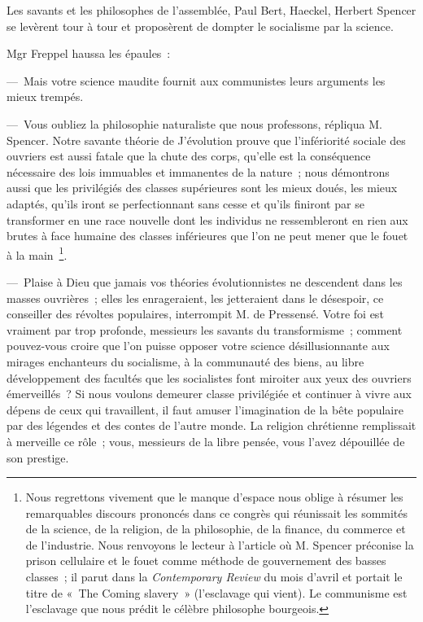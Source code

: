 \documentclass[french,twoside]{book} %
\begin{document}
Les savants et les philosophes de l’assemblée, Paul Bert, Haeckel, Herbert Spencer se levèrent tour à tour et proposèrent de dompter le socialisme par la science.\par
Mgr Freppel haussa les épaules :\par
— Mais votre science maudite fournit aux communistes leurs arguments les mieux trempés.\par
— Vous oubliez la philosophie naturaliste que nous professons, répliqua M. Spencer. Notre savante théorie de J'évolution prouve que l’infériorité sociale des ouvriers est aussi fatale que la chute des corps, qu’elle est la conséquence nécessaire des lois immuables et immanentes de la nature ; nous démontrons aussi que les privilégiés des classes supérieures sont les mieux doués, les mieux adaptés, qu’ils iront se perfectionnant sans cesse et qu’ils finiront par se transformer en une race nouvelle dont les individus ne ressembleront en rien aux brutes à face humaine des classes inférieures que l’on ne peut mener que le fouet à la main \footnote{Nous regrettons vivement que le manque d’espace nous oblige à résumer les remarquables discours prononcés dans ce congrès qui réunissait les sommités de la science, de la religion, de la philosophie, de la finance, du commerce et de l’industrie. Nous renvoyons le lecteur à l’article où M. Spencer préconise la prison cellulaire et le fouet comme méthode de gouvernement des basses classes ; il parut dans la \emph{Contemporary Review} du mois d’avril et portait le titre de « The Coming slavery » (l’esclavage qui vient). Le communisme est l’esclavage que nous prédit le célèbre philosophe bourgeois.}.\par
— Plaise à Dieu que jamais vos théories évolutionnistes ne descendent dans les masses ouvrières ; elles les enrageraient, les jetteraient dans le désespoir, ce conseiller des révoltes populaires, interrompit M. de Pressensé. Votre foi est vraiment par trop profonde, messieurs les savants du transformisme ; comment pouvez-vous croire que l’on puisse opposer votre science désillusionnante aux mirages enchanteurs du socialisme, à la communauté des biens, au libre développement des facultés que les socialistes font miroiter aux yeux des ouvriers émerveillés ? Si nous voulons demeurer classe privilégiée et continuer à vivre aux dépens de ceux qui travaillent, il faut amuser l’imagination de la bête populaire par des légendes et des contes de l’autre monde. La religion chrétienne remplissait à merveille ce rôle ; vous, messieurs de la libre pensée, vous l’avez dépouillée de son prestige.\par
\end{document}
